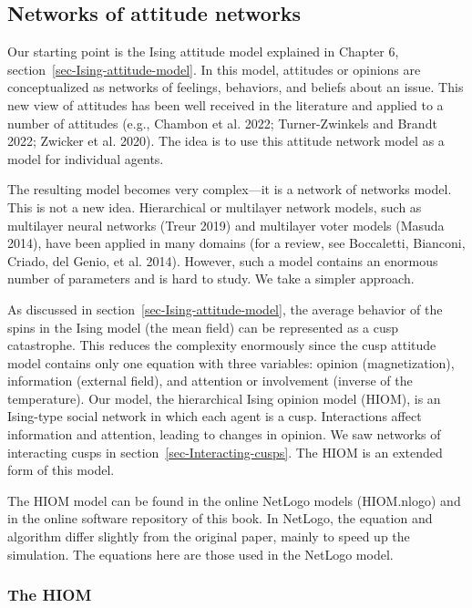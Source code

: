 \documentclass[
  a4paper,
  DIV=11,
  numbers=noendperiod,
  oneside]{scrreprt}
\begin{document}
\subsection{Networks of attitude
networks}\label{sec-Networks-of-attitude-networks}

Our starting point is the Ising attitude model explained in Chapter 6,
section~\ref{sec-Ising-attitude-model}. In this model, attitudes or
opinions are conceptualized as networks of feelings, behaviors, and
beliefs about an issue. This new view of attitudes has been well
received in the literature and applied to a number of attitudes (e.g.,
Chambon et al. 2022; Turner-Zwinkels and Brandt 2022; Zwicker et al.
2020). The idea is to use this attitude network model as a model for
individual agents.

The resulting model becomes very complex---it is a network of networks
model. This is not a new idea. Hierarchical or multilayer network
models, such as multilayer neural networks (Treur 2019) and multilayer
voter models (Masuda 2014), have been applied in many domains (for a
review, see Boccaletti, Bianconi, Criado, del Genio, et al. 2014).
However, such a model contains an enormous number of parameters and is
hard to study. We take a simpler approach.

As discussed in section~\ref{sec-Ising-attitude-model}, the average
behavior of the spins in the Ising model (the mean field) can be
represented as a cusp catastrophe. This reduces the complexity
enormously since the cusp attitude model contains only one equation with
three variables: opinion (magnetization), information (external field),
and attention or involvement (inverse of the temperature). Our model,
the hierarchical Ising opinion model (HIOM), is an Ising-type social
network in which each agent is a cusp. Interactions affect information
and attention, leading to changes in opinion. We saw networks of
interacting cusps in section~\ref{sec-Interacting-cusps}. The HIOM is an
extended form of this model.

The HIOM model can be found in the online NetLogo models (HIOM.nlogo)
and in the online software repository of this book. In NetLogo, the
equation and algorithm differ slightly from the original paper, mainly
to speed up the simulation. The equations here are those used in the
NetLogo model.

\subsubsection{The HIOM}\label{sec-The-HIOM-model}
\end{document}
